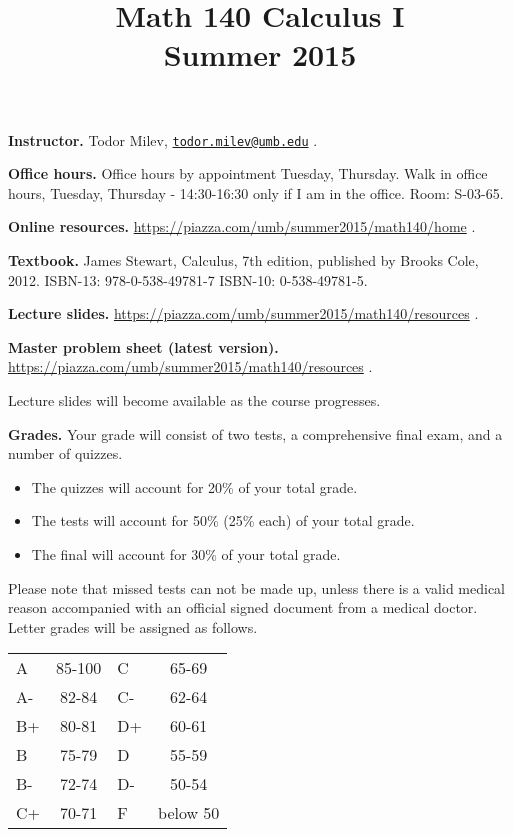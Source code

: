 \documentclass{article}
\title{Math 140 Calculus I \\ Summer 2015}
\date{}
\newcommand{\websitebase}{https://piazza.com/umb/summer2015/math140}
\begin{document}
\maketitle

\noindent \textbf{Instructor.} Todor Milev, \href{mailto:todor.milev@umb.edu}{\nolinkurl{todor.milev@umb.edu}} \quad \quad \quad .

\medskip
\noindent \textbf{Office hours. } Office hours by appointment Tuesday, Thursday. Walk in office hours, Tuesday, Thursday - 14:30-16:30 only if I am in the office. Room: S-03-65.

\medskip
\noindent \textbf{Online resources. }  \url{\websitebase/home}  \quad \quad \quad .


\medskip\noindent \textbf{Textbook. }  James Stewart, Calculus, 7th edition, published by Brooks Cole, 2012. ISBN-13: 978-0-538-49781-7
ISBN-10: 0-538-49781-5.

\medskip \noindent \textbf{Lecture slides. }  \url{\websitebase/resources} \quad \quad \quad .

\medskip \noindent \textbf{Master problem sheet (latest version). }  \url{\websitebase/resources} \quad \quad \quad .


\medskip\noindent Lecture slides will become available as the course progresses.



\medskip
\noindent \textbf{Grades.} Your grade will consist of two tests, a comprehensive final exam, and a number of quizzes. 
\begin{itemize}
\item The quizzes will account for 20\% of your total grade.
\item The tests will account for 50\% (25\% each) of your total grade.
\item The final will account for 30\% of your total grade.
\end{itemize}
Please note that missed tests can not be made up, unless there is a valid medical reason accompanied with an official signed document from a medical doctor. Letter grades will be assigned as follows. 

\begin{center}
\begin{tabular}{lc|lc}
A & 85-100 & C & 65-69 \\
A-& 82-84 & C- & 62-64 \\
B+& 80-81 & D+ & 60-61 \\
B & 75-79& D & 55-59\\
B-& 72-74& D- & 50-54\\
C+& 70-71& F & below 50\\
\end{tabular}

\end{center}
\end{document}
